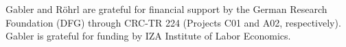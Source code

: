 Gabler and Röhrl are grateful for financial support by the German Research Foundation
(DFG) through CRC-TR 224 (Projects C01 and A02, respectively). Gabler is grateful for
funding by IZA Institute of Labor Economics.
